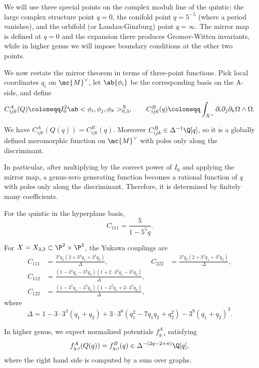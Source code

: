 We will use three special points on the complex moduli line of the quintic: the large complex structure point \(q=0\), the conifold point \(q = 5^{-5}\) (where a period vanishes), and the orbifold (or Landau-Ginzburg) point \(q = \infty\). The mirror map is defined at \(q=0\) and the expansion there produces Gromov-Witten invariants, while in higher genus we will impose boundary conditions at the other two points.

We now restate the mirror theorem in terms of three-point functions. Pick local coordinates \(q_i\) on \(\mc{M}^{\vee}\), let \(\ab\{\phi_i\}\) be the corresponding basis on the A-side, and define
\[ C^A_{ijk}(Q) \coloneqq I_0^2 \ab<\phi_i, \phi_j, \phi_k>^X_{0,3}, \qquad C^B_{ijk}(q) \coloneqq \int_{X^{\vee}} \partial_i \partial_j \partial_k \Omega \wedge \Omega. \]

\begin{thm}
    We have \(C^A_{ijk}(Q(q)) = C^B_{ijk}(q)\). Moreover \(C^B_{ijk} \in \Delta^{-1}\Q[q]\), so it is a globally defined meromorphic function on \(\mc{M}^{\vee}\) with poles only along the discriminant.
\end{thm}

In particular, after multiplying by the correct power of \(I_0\) and applying the mirror map, a genus-zero generating function becomes a rational function of \(q\) with poles only along the discriminant. Therefore, it is determined by finitely many coefficients.

\begin{exm}
    For the quintic in the hyperplane basis,
    \[ C_{111} = \frac{5}{1-5^5 q}. \]
\end{exm}

\begin{exm}
    For \(X = X_{3,3} \subset \P^2 \times \P^2\), the Yukawa couplings are
    \begin{align*}
        C_{111} &= \frac{3^4 q_1 (2+3^3q_1+3^3q_2)}{\Delta}, & C_{222} &= \frac{3^4 q_2(2+3^3q_1+3^3q_2)}{\Delta}, \\
        C_{112} &= \frac{(1-3^3q_1-3^3q_2)(1+2\cdot 3^3 q_1 - 3^3 q_2)}{\Delta}, \\
        C_{122} &= \frac{(1-3^3q_1-3^3q_2)(1-3^3q_1+2\cdot3^3q_2)}{\Delta},
    \end{align*}
    where
    \[ \Delta = 1 - 3\cdot3^3(q_1+q_2) + 3\cdot3^6(q_1^2 - 7q_1q_2+q_2^2) - 3^9(q_1+q_2)^3. \]
\end{exm}

In higher genus, we expect normalized potentials \(f^A_{g,i}\) satisfying
\[ f^A_{g,i}(Q(q)) = f^B_{g,i}(q) \in \Delta^{-(2g-2+n)}\Q[q], \]
where the right hand side is computed by a sum over graphs.

